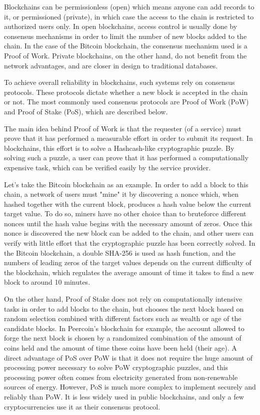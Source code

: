 \documentclass{article}
\begin{document}
\bigskip

Blockchains can be permissionless (open) which means anyone can add records to it, or permissioned (private), in which case the access to the chain is restricted to authorized users only. In open blockchains, access control is usually done by consensus mechanisms in order to limit the number of new blocks added to the chain. In the case of the Bitcoin blockchain, the consensus mechanism used is a Proof of Work.
Private blockchains, on the other hand, do not benefit from the network advantages, and are closer in design to traditional databases.

\bigskip

To achieve overall reliability in blockchains, such systems rely on consensus protocols. These protocols dictate whether a new block is accepted in the chain or not. The most commonly used consensus protocols are Proof of Work (PoW) and Proof of Stake (PoS), which are described below.

\bigskip

The main idea behind Proof of Work is that the requester (of a service) must prove that it has performed a measurable effort in order to submit its request. In blockchains, this effort is to solve a Hashcash-like\cite{back2002hashcash} cryptographic puzzle. By solving such a puzzle, a user can prove that it has performed a computationally expensive task, which can be verified easily by the service provider.


Let's take the Bitcoin blockchain as an example. In order to add a block to this chain, a network of users must "mine" it by discovering a nonce which, when hashed together with the current block, produces a hash value below the current target value. To do so, miners have no other choice than to bruteforce different nonces until the hash value begins with the necessary amount of zeros. Once this nonce is discovered the new block can be added to the chain, and other users can verify with little effort that the cryptographic puzzle has been correctly solved. In the Bitcoin blockchain, a double SHA-256 is used as hash function, and the numbers of leading zeros of the target values depends on the current difficulty of the blockchain, which regulates the average amount of time it takes to find a new block to around 10 minutes.

\bigskip

On the other hand, Proof of Stake does not rely on computationally intensive tasks in order to add blocks to the chain, but chooses the next block based on random selection combined with different factors such as wealth or age of the candidate blocks. In Peercoin's blockchain for example, the account allowed to forge the next block is chosen by a randomized combination of the amount of coins held and the amount of time these coins have been held (their age). A direct advantage of PoS over PoW is that it does not require the huge amount of processing power necessary to solve PoW cryptographic puzzles, and this processing power often comes from electricity generated from non-renewable sources of energy. However, PoS is much more complex to implement securely and reliably than PoW. It is less widely used in public blockchains, and only a few cryptocurrencies use it as their consensus protocol.
\end{document}
